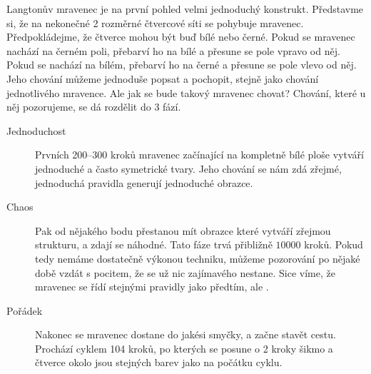 \documentclass[12pt]{article}
\begin{document}
Langtonův mravenec je na první pohled velmi jednoduchý konstrukt. Představme si, že na nekonečné 2 rozměrné čtvercové síti se pohybuje mravenec. Předpokládejme, že čtverce mohou být buď bílé nebo černé. Pokud se mravenec nachází na černém poli, přebarví ho na bílé a přesune se pole vpravo od něj. Pokud se nachází na bílém, přebarví ho na černé a přesune se pole vlevo od něj. Jeho chování můžeme jednoduše popsat a pochopit, stejně jako chování jednotlivého mravence. Ale jak se bude takový mravenec chovat? Chování, které u něj pozorujeme, se dá rozdělit do 3 fází.
\begin{description}
\item[Jednoduchost] 
Prvních 200--300 kroků mravenec začínající na kompletně bílé ploše vytváří jednoduché a často symetrické tvary. Jeho chování se nám zdá zřejmé, jednoduchá pravidla generují jednoduché obrazce.

\item[Chaos]
Pak od nějakého bodu přestanou mít obrazce které vytváří zřejmou strukturu, a zdají se náhodné. Tato fáze trvá přibližně $10000$ kroků. Pokud tedy nemáme dostatečně výkonou techniku, můžeme pozorování po nějaké době vzdát s pocitem, že se už nic zajímavého nestane. Sice víme, že mravenec se řídí stejnými pravidly jako předtím, ale .

\item[Pořádek] Nakonec se mravenec dostane do jakési smyčky, a začne stavět cestu. Prochází cyklem 104 kroků, po kterých se posune o 2 kroky šikmo a čtverce okolo jsou stejných barev jako na počátku cyklu. 
\end{description}
\end{document}
